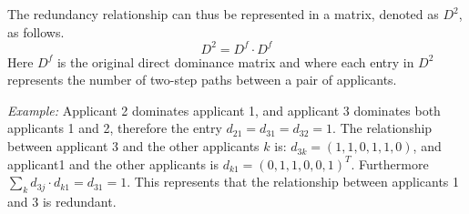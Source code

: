 \documentclass[12pt,english]{report}
\begin{document}
The redundancy relationship can thus  be represented in a matrix, denoted as
$D^2$,  as follows. $$D^2 = D^{f} \cdot D^{f} $$  Here $D^f$ is the original
direct dominance matrix and where each entry in $D^2$ represents the number of
two-step paths between a pair of applicants.
 
\textit{Example:} Applicant 2 dominates applicant 1, and applicant 3 dominates
both applicants 1 and 2, therefore the entry $d_{21}=d_{31}=d_{32}=1$. The
relationship between applicant 3 and the other applicants $k$ is:
$d_{3k}=(1,1,0,1,1,0)$, and applicant1 and the other applicants is
$d_{k1}=(0,1,1,0,0,1) ^T $. Furthermore $\sum_k d_{3j} \cdot d_{k1}=d_{31}=1$.
This represents that the relationship between applicants 1 and 3 is redundant.


\begin{figure}
\begin{floatrow}
\capbtabbox{%
	\begin{tabular}{l|llllll}
		& 1 & 2 & 3 & 4 & 5 & 6 \\ \hline
		1 & 0 & 0 & 0 & 0 & 0 & 0 \\
		2 & 0 & 0 & 0 & 0 & 0 & 0 \\
		3 & 1 & 0 & 0 & 1 & 1 & 0 \\
		4 & 0 & 0 & 0 & 0 & 0 & 0 \\
		5 & 0 & 0 & 0 & 0 & 0 & 0 \\
		6 & 1 & 1 & 0 & 1 & 1 & 0 \\
	\end{tabular}
	\label{domin_matrix2}%
}{%
\caption{Redundant Dominance Relation in Matrix}%
\label{redundant1}
}
\end{floatrow}
\end{figure}
\end{document}
